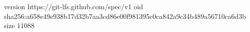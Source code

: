 version https://git-lfs.github.com/spec/v1
oid sha256:a658e49e938b17d32b7aa3cd86e00f981395c0ca842a9c34b489a56710ca6d3b
size 11088
